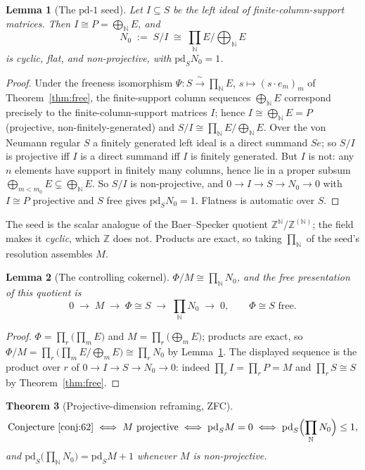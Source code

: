 \documentclass[11pt,reqno]{amsart}
\theoremstyle{plain}
\newtheorem{theorem}{Theorem}[section]
\newtheorem{lemma}[theorem]{Lemma}
\theoremstyle{definition}
\theoremstyle{remark}
\newcommand{\pd}{\mathrm{pd}}
\newcommand{\N}{\mathbb{N}}
\newcommand{\Z}{\mathbb{Z}}
\begin{document}
\begin{lemma}[The $\pd$-$1$ seed]\label{lem:seed}
Let $I\subseteq S$ be the left ideal of finite-column-support matrices. Then $I\cong P=\bigoplus_{\N}E$, and
\[
  N_0\;:=\;S/I\;\cong\;\prod_{\N}E\big/\!\bigoplus_{\N}E
\]
is cyclic, flat, and non-projective, with $\pd_S N_0=1$.
\end{lemma}

\begin{proof}
Under the freeness isomorphism $\Psi\colon S\xrightarrow{\ \sim\ }\prod_{\N}E$, $s\mapsto(s\cdot e_m)_m$ of Theorem~\ref{thm:free}, the finite-support column sequences $\bigoplus_{\N}E$ correspond precisely to the finite-column-support matrices $I$; hence $I\cong\bigoplus_{\N}E=P$ (projective, non-finitely-generated) and $S/I\cong\prod_{\N}E/\bigoplus_{\N}E$. Over the von Neumann regular $S$ a finitely generated left ideal is a direct summand $Se$; so $S/I$ is projective iff $I$ is a direct summand iff $I$ is finitely generated. But $I$ is not: any $n$ elements have support in finitely many columns, hence lie in a proper subsum $\bigoplus_{m<m_0}E\subsetneq\bigoplus_{\N}E$. So $S/I$ is non-projective, and $0\to I\to S\to N_0\to0$ with $I\cong P$ projective and $S$ free gives $\pd_S N_0=1$. Flatness is automatic over $S$.
\end{proof}

The seed is the scalar analogue of the Baer--Specker quotient $\Z^{\N}/\Z^{(\N)}$; the field makes it \emph{cyclic}, which $\Z$ does not. Products are exact, so taking $\prod_{\N}$ of the seed's resolution assembles $M$.

\begin{lemma}[The controlling cokernel]\label{lem:cokernel}
$\Phi/M\cong\prod_{\N}N_0$, and the free presentation of this quotient is
\[
  0\;\longrightarrow\;M\;\longrightarrow\;\Phi\cong S\;\longrightarrow\;\prod_{\N}N_0\;\longrightarrow\;0,\qquad\Phi\cong S\text{ free.}
\]
\end{lemma}

\begin{proof}
$\Phi=\prod_r\bigl(\prod_m E\bigr)$ and $M=\prod_r\bigl(\bigoplus_m E\bigr)$; products are exact, so $\Phi/M=\prod_r\bigl(\prod_m E/\bigoplus_m E\bigr)\cong\prod_r N_0$ by Lemma~\ref{lem:seed}. The displayed sequence is the product over $r$ of $0\to I\to S\to N_0\to0$: indeed $\prod_r I=\prod_r P=M$ and $\prod_r S\cong S$ by Theorem~\ref{thm:free}.
\end{proof}

\begin{theorem}[Projective-dimension reframing, ZFC]\label{thm:pd-reframe}
\[
  \text{Conjecture~\ref{conj:62}}\iff M\text{ projective}\iff \pd_S M=0\iff \pd_S\Bigl(\prod_{\N}N_0\Bigr)\le 1,
\]
and $\pd_S\bigl(\prod_{\N}N_0\bigr)=\pd_S M+1$ whenever $M$ is non-projective.
\end{theorem}
\end{document}
